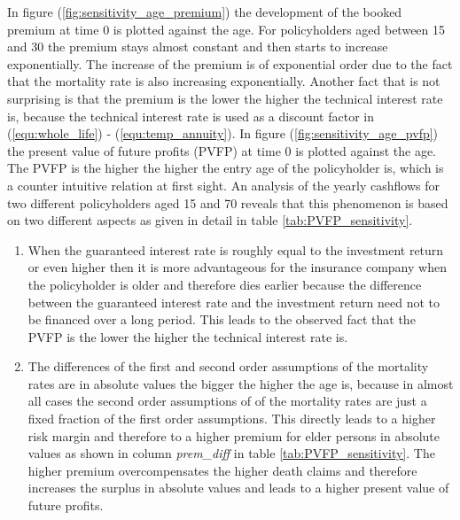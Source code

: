 In figure (\ref{fig:sensitivity_age_premium}) the development of the booked premium at time 0 is plotted against the age. For policyholders aged between 15 and 30 the premium stays almost constant and then starts to increase exponentially. The increase of the premium is of exponential order due to the fact that the mortality rate is also increasing exponentially. Another fact that is not surprising is that the premium is the lower the higher the technical interest rate is, because the technical interest rate is used as a discount factor in (\ref{equ:whole_life}) - (\ref{equ:temp_annuity}). In figure  (\ref{fig:sensitivity_age_pvfp}) the present value of future profits (PVFP) at time 0 is plotted against the age. The PVFP is the higher the higher the entry age of the policyholder is, which is a counter intuitive relation at first sight. An analysis of the yearly cashflows for two different policyholders aged 15 and 70 reveals that this phenomenon is based on two different aspects as given in detail in table \ref{tab:PVFP_sensitivity}. 
\begin{enumerate}
	\item When the guaranteed interest rate is roughly equal to the investment return or even higher then it is more 		advantageous for the insurance company when the policyholder is older and therefore dies earlier because the difference between the guaranteed interest rate and the investment return need not to be financed over a long period. This leads to the observed fact that the PVFP is the lower the higher the technical interest rate is.
	\item The differences of the first and second order assumptions of the mortality rates are in absolute values the bigger the higher the age is, because in almost all cases the second order assumptions of of the mortality rates are just a fixed fraction of the first order assumptions. This directly leads to a higher risk margin and therefore to a higher premium for elder persons in absolute values as shown in column \textit{prem\_diff} in table \ref{tab:PVFP_sensitivity}. The  higher premium overcompensates the higher death claims and therefore increases the surplus in absolute values and leads to a higher present value of future profits. 
\end{enumerate}
